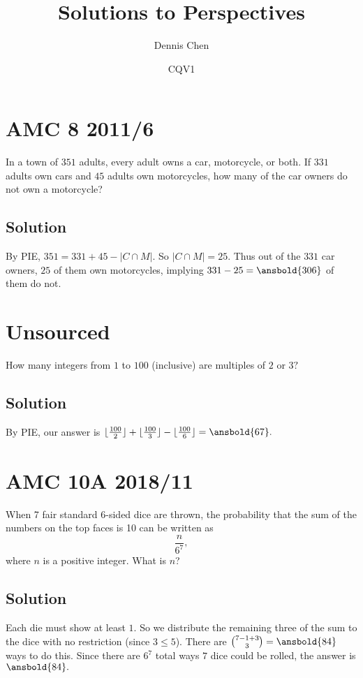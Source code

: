 \documentclass{article}
\title{Solutions to Perspectives}
\author{Dennis Chen}
\date{CQV1}
\begin{document}
\maketitle

\toc

\pagebreak\section{AMC 8 2011/6}
In a town of $351$ adults, every adult owns a car, motorcycle, or both. If $331$ adults own cars and $45$ adults own motorcycles, how many of the car owners do not own a motorcycle?

\subsection{Solution}
By PIE, $351=331+45-|C \cap M|.$ So $|C\cap M|=25.$ Thus out of the $331$ car owners, $25$ of them own motorcycles, implying $331-25=\ansbold{306}$ of them do not.

\pagebreak\section{Unsourced}
How many integers from $1$ to $100$ (inclusive) are multiples of $2$ or $3?$

\subsection{Solution}
By PIE, our answer is $\lfloor\frac{100}{2}\rfloor+\lfloor\frac{100}{3}\rfloor-\lfloor\frac{100}{6}\rfloor=\ansbold{67}.$

\pagebreak\section{AMC 10A 2018/11}
When 7 fair standard 6-sided dice are thrown, the probability that the sum of the numbers on the top faces is 10 can be written as\[\frac{n}{6^7},\]where $n$ is a positive integer. What is $n$?

\subsection{Solution}
Each die must show at least $1.$ So we distribute the remaining three of the sum to the dice with no restriction (since $3\leq 5$). There are $\binom{7-1+3}{3}=\ansbold{84}$ ways to do this. Since there are $6^7$ total ways $7$ dice could be rolled, the answer is $\ansbold{84}.$
\end{document}

